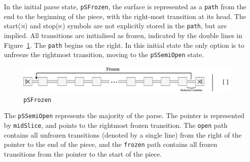 \documentclass[12pt,a4paper,twoside,openany]{report} \usepackage[pdfborder={0 0 0}]{hyperref}    %
\theoremstyle{definition} \newtheorem{definition}{Definition}[section]
\begin{document}

      In the initial parse state, \texttt{pSFrozen}, the surface is represented as a \texttt{path} from the end to the
      beginning of the piece, with the right-most transition at its head. The start($\rtimes$) and stop($\ltimes$)
      symbols are not explicitly stored in the \texttt{path}, but are implied.
      All transitions are initialised as frozen, indicated by the double lines in Figure~\ref{fig:pSFrozen}. The
      \texttt{path} begins on the right. In this initial state the only option is to unfreeze the rightmost transition,
      moving to the \texttt{pSSemiOpen} state. 

      \begin{figure}[ht] \centering\includegraphics[width=\textwidth]{impl/parseState/frozen.png}
      \caption{\texttt{pSFrozen}} \label{fig:pSFrozen} \end{figure}

      The \texttt{pSSemiOpen} represents the majority of the parse. The pointer is represented by \texttt{midSlice}, and
      points to the rightmost frozen transition. The \texttt{open} path contains all unfrozen transitions (denoted by
      a single line) from the right of the pointer to the end of the piece, and the \texttt{frozen} path contains all
      frozen transitions from the pointer to the start of the piece.
\end{document}
